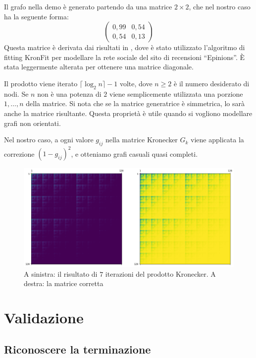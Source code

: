 \documentclass[target=bach,aauheader=,style=]{thud}
\newcommand{\eng}[1]{\foreignlanguage{english}{#1}}
\begin{document}
Il grafo nella demo è generato partendo da una matrice $2\times 2$, che nel nostro caso ha la seguente forma:
$$
\begin{pmatrix}
  0,99 & 0,54 \\
  0,54 & 0,13
\end{pmatrix}
$$
Questa matrice è derivata dai risultati in \cite{10.5555/1756006.1756039}, dove è stato utilizzato l'algoritmo di \eng{fitting} KronFit per modellare la rete sociale del sito di recensioni ``\eng{Epinions}''. È stata leggermente alterata per ottenere una matrice diagonale.

Il prodotto viene iterato $\lceil{\log_2{n}}\rceil-1$ volte, dove $n\geq 2$ è il numero desiderato di nodi. Se $n$ non è una potenza di $2$ viene semplicemente utilizzata una porzione $1,\dotsc,n$ della matrice. Si nota che se la matrice generatrice è simmetrica, lo sarà anche la matrice risultante. Questa proprietà è utile quando si vogliono modellare grafi non orientati.

Nel nostro caso, a ogni valore $g_{ij}$ nella matrice Kronecker $G_k$ viene applicata la correzione $(1-g_{ij})^2$, e otteniamo grafi casuali quasi completi.
\begin{figure}[H]
    \centering
    \includegraphics[width=1\linewidth]{images/kronecker-adjacency.png}
    \caption{A sinistra: il risultato di $7$ iterazioni del prodotto Kronecker. A destra: la matrice corretta}
    \label{fig:enter-label}
\end{figure}

\section{Validazione}

\subsection{Riconoscere la terminazione}\label{impl:termination}
\end{document}
